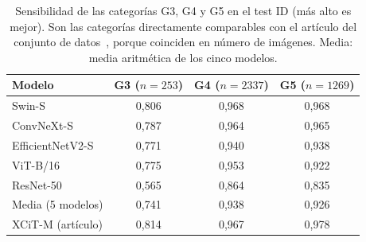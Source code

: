 \begin{table}
\centering
\small
\caption{Sensibilidad de las categorías G3, G4 y G5 en el test ID (más alto es mejor). Son las categorías directamente comparables con el artículo del conjunto de datos~\cite{ayensa2026}, porque coinciden en número de imágenes. Media: media aritmética de los cinco modelos.}
\label{tab:sensibilidad-gleason}
\begin{tabular*}{\linewidth}{@{\extracolsep{\fill}}lccc}
\toprule
Modelo & G3 ($n=\num{253}$) & G4 ($n=\num{2337}$) & G5 ($n=\num{1269}$) \\
\midrule
Swin-S & 0{,}806 & 0{,}968 & 0{,}968 \\
ConvNeXt-S & 0{,}787 & 0{,}964 & 0{,}965 \\
EfficientNetV2-S & 0{,}771 & 0{,}940 & 0{,}938 \\
ViT-B/16 & 0{,}775 & 0{,}953 & 0{,}922 \\
ResNet-50 & 0{,}565 & 0{,}864 & 0{,}835 \\
\midrule
Media (5 modelos) & 0{,}741 & 0{,}938 & 0{,}926 \\
\midrule
XCiT-M (artículo) & 0{,}814 & 0{,}967 & 0{,}978 \\
\bottomrule
\end{tabular*}
\end{table}
